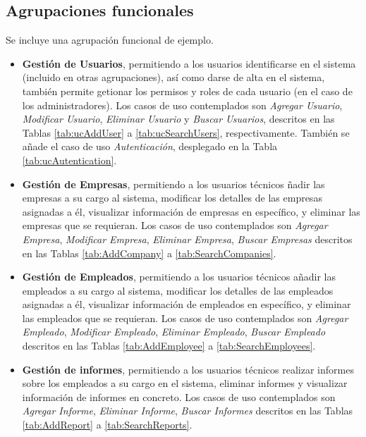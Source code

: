 \subsection{\forlnameref Agrupaciones funcionales}
\label{sec:functionalGroups}

\begin{shaded}
Se incluye una agrupación funcional de ejemplo.
\end{shaded}

\begin{itemize}
    \item \textbf{Gestión de Usuarios}, permitiendo a los usuarios identificarse en el sistema (incluido en otras agrupaciones), así como darse de alta en el sistema, también permite getionar los permisos y roles de cada usuario (en el caso de los administradores). Los casos de uso contemplados son \textit{Agregar Usuario}, \textit{Modificar Usuario}, \textit{Eliminar Usuario} y \textit{Buscar Usuarios}, descritos en las Tablas \ref{tab:ucAddUser} a \ref{tab:ucSearchUsers}, respectivamente. También se añade el caso de uso \textit{Autenticación}, desplegado en la Tabla \ref{tab:ucAutentication}.
    \item \textbf{Gestión de Empresas},
    permitiendo a los usuarios técnicos ñadir las empresas a su cargo al sistema, modificar los detalles de las empresas asignadas a él, visualizar información de empresas en específico, y eliminar las empresas que se requieran. Los casos de uso contemplados son
    \textit{Agregar Empresa},
    \textit{Modificar Empresa},
    \textit{Eliminar Empresa},
    \textit{Buscar Empresas} descritos en las Tablas \ref{tab:AddCompany} a \ref{tab:SearchCompanies}.
    \item \textbf{Gestión de Empleados},
    permitiendo a los usuarios técnicos añadir las empleados a su cargo al sistema, modificar los detalles de las empleados asignadas a él, visualizar información de empleados en específico, y eliminar las empleados que se requieran. Los casos de uso contemplados son
    \textit{Agregar Empleado},
    \textit{Modificar Empleado},
    \textit{Eliminar Empleado},
    \textit{Buscar Empleado} descritos en las Tablas \ref{tab:AddEmployee} a \ref{tab:SearchEmployees}.

    \item \textbf{Gestión de informes},
    permitiendo a los usuarios técnicos realizar informes sobre los empleados a su cargo en el sistema, eliminar informes y visualizar información de informes en concreto. Los casos de uso contemplados son 
    \textit{Agregar Informe},
    \textit{Eliminar Informe},
    \textit{Buscar Informes} descritos en las Tablas \ref{tab:AddReport} a \ref{tab:SearchReports}.
    
    
\end{itemize}